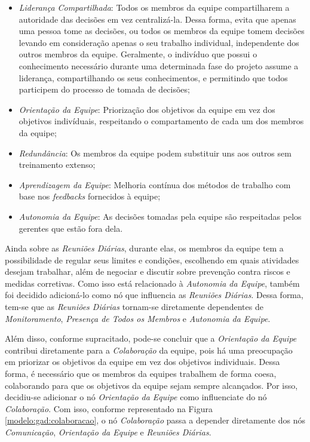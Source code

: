 \begin{itemize}
  \item \textit{Liderança Compartilhada}: Todos os membros da equipe compartilharem a autoridade das decisões em vez centralizá-la. Dessa forma, evita que apenas uma pessoa tome as decisões, ou todos os membros da equipe tomem decisões levando em consideração apenas o seu trabalho individual, independente dos outros membros da equipe. Geralmente, o indivíduo que possui o conhecimento necessário durante uma determinada fase do projeto assume a liderança, compartilhando os seus conhecimentos, e permitindo que todos participem do processo de tomada de decisões;
  \item \textit{Orientação da Equipe}: Priorização dos objetivos da equipe em vez dos objetivos indivíduais, respeitando o compartamento de cada um dos membros da equipe;
  \item \textit{Redundância}: Os membros da equipe podem substituir uns aos outros sem treinamento extenso;
  \item \textit{Aprendizagem da Equipe}: Melhoria contínua dos métodos de trabalho com base nos \textit{feedbacks} fornecidos à equipe;
  \item \textit{Autonomia da Equipe}: As decisões tomadas pela equipe são respeitadas pelos gerentes que estão fora dela.
\end{itemize}

Ainda sobre as \textit{Reuniões Diárias}, durante elas, os membros da equipe tem a possibilidade de regular seus limites e condições, escolhendo em quais atividades desejam trabalhar, além de negociar e discutir sobre prevenção contra riscos e medidas corretivas. Como isso está relacionado à \textit{Autonomia da Equipe}, também foi decidido adicioná-lo como nó que influencia as \textit{Reuniões Diárias}. Dessa forma, tem-se que as \textit{Reuniões Diárias} tornam-se diretamente dependentes de \textit{Monitoramento}, \textit{Presença de Todos os Membros} e \textit{Autonomia da Equipe}.

Além disso, conforme supracitado, pode-se concluir que a \textit{Orientação da Equipe} contribui diretamente para a \textit{Colaboração} da equipe, pois há uma preocupação em priorizar os objetivos da equipe em vez dos objetivos individuais. Dessa forma, é necessário que os membros da equipes trabalhem de forma coesa, colaborando para que os objetivos da equipe sejam sempre alcançados. Por isso, decidiu-se adicionar o nó \textit{Orientação da Equipe} como influenciate do nó \textit{Colaboração}. Com isso, conforme representado na Figura \ref{modelo:gad:colaboracao}, o nó \textit{Colaboração} passa a depender diretamente dos nós \textit{Comunicação}, \textit{Orientação da Equipe} e \textit{Reuniões Diárias}.


